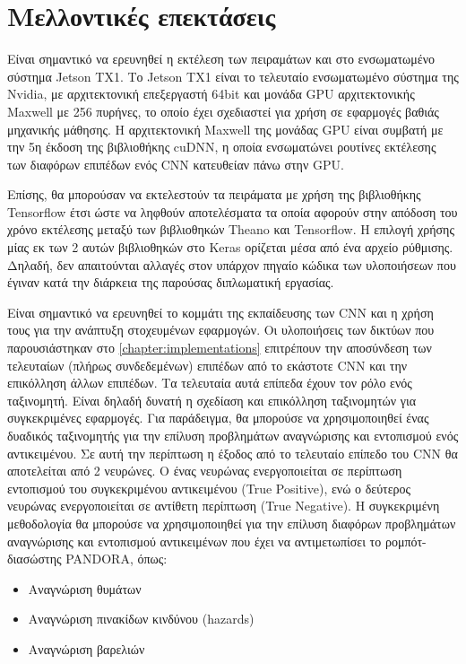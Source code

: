 \chapter{Μελλοντικές επεκτάσεις}
\label{chapter:future_work}

Είναι σημαντικό να ερευνηθεί η εκτέλεση των πειραμάτων και στο ενσωματωμένο σύστημα
Jetson TΧ1. Το Jetson TX1 είναι το τελευταίο ενσωματωμένο σύστημα της Nvidia,
με αρχιτεκτονική επεξεργαστή 64bit και μονάδα GPU αρχιτεκτονικής Maxwell με
256 πυρήνες, το οποίο έχει σχεδιαστεί για χρήση σε εφαρμογές βαθιάς
μηχανικής μάθησης. Η αρχιτεκτονική Maxwell της μονάδας GPU είναι συμβατή
με την 5η έκδοση της βιβλιοθήκης cuDNN, η οποία ενσωματώνει ρουτίνες
εκτέλεσης των διαφόρων επιπέδων ενός CNN κατευθείαν πάνω στην GPU.

Επίσης, θα μπορούσαν να εκτελεστούν τα πειράματα με χρήση της βιβλιοθήκης
Tensorflow έτσι ώστε να ληφθούν αποτελέσματα τα οποία αφορούν στην απόδοση
του χρόνο εκτέλεσης μεταξύ των βιβλιοθηκών Theano και Tensorflow.
Η επιλογή χρήσης μίας εκ των 2 αυτών βιβλιοθηκών στο Keras ορίζεται μέσα από
ένα αρχείο ρύθμισης. Δηλαδή, δεν απαιτούνται αλλαγές στον υπάρχον πηγαίο κώδικα
των υλοποιήσεων που έγιναν κατά την διάρκεια της παρούσας διπλωματική εργασίας.

Είναι σημαντικό να ερευνηθεί το κομμάτι της εκπαίδευσης των CNN
και η χρήση τους για την ανάπτυξη στοχευμένων εφαρμογών.
Οι υλοποιήσεις των δικτύων που παρουσιάστηκαν στο \autoref{chapter:implementations}
επιτρέπουν την αποσύνδεση των τελευταίων (πλήρως συνδεδεμένων) επιπέδων από
το εκάστοτε CNN και την επικόλληση άλλων επιπέδων.
Τα τελευταία αυτά επίπεδα έχουν τον ρόλο ενός ταξινομητή. Είναι δηλαδή
δυνατή η σχεδίαση και επικόλληση ταξινομητών για συγκεκριμένες εφαρμογές.
Για παράδειγμα, θα μπορούσε να χρησιμοποιηθεί ένας δυαδικός ταξινομητής
για την επίλυση προβλημάτων αναγνώρισης και εντοπισμού ενός αντικειμένου. Σε αυτή
την περίπτωση η έξοδος από το τελευταίο επίπεδο του CNN θα αποτελείται
από 2 νευρώνες. Ο ένας νευρώνας ενεργοποιείται σε περίπτωση εντοπισμού
του συγκεκριμένου αντικειμένου (True Positive), ενώ ο δεύτερος νευρώνας ενεργοποιείται
σε αντίθετη περίπτωση (True Negative).
Η συγκεκριμένη μεθοδολογία θα μπορούσε να χρησιμοποιηθεί για την επίλυση διαφόρων
προβλημάτων αναγνώρισης και εντοπισμού αντικειμένων που έχει να αντιμετωπίσει το ρομπότ-διασώστης PANDORA,
όπως:
\begin{itemize}
  \item{Αναγνώριση θυμάτων}
  \item{Αναγνώριση πινακίδων κινδύνου (hazards)}
  \item{Αναγνώριση βαρελιών}
\end{itemize}


